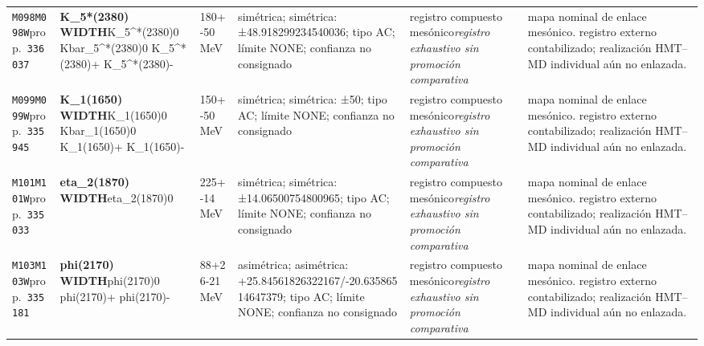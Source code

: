 \begin{landscape}
\begin{longtable}{L{1.85cm}L{4.45cm}L{2.35cm}L{4.05cm}L{3.35cm}L{7.15cm}}
\texttt{M098}\newline \texttt{M098W}\newline prop.\ \texttt{336037} & \textbf{K\_\allowbreak{}5*(2380) WIDTH}\newline K\_\allowbreak{}5\textasciicircum{}*(2380)0 \textbar{}\allowbreak{} Kbar\_\allowbreak{}5\textasciicircum{}*(2380)0 \textbar{}\allowbreak{} K\_\allowbreak{}5\textasciicircum{}*(2380)+ \textbar{}\allowbreak{} K\_\allowbreak{}5\textasciicircum{}*(2380)- & 180+-50\,MeV & simétrica; simétrica: ±48.918299234540036; tipo AC; límite NONE; confianza no consignado & registro compuesto mesónico\newline \emph{registro exhaustivo sin promoción comparativa} & mapa nominal de enlace mesónico. registro externo contabilizado; realización HMT--MD individual aún no enlazada. \\
\texttt{M099}\newline \texttt{M099W}\newline prop.\ \texttt{335945} & \textbf{K\_\allowbreak{}1(1650) WIDTH}\newline K\_\allowbreak{}1(1650)0 \textbar{}\allowbreak{} Kbar\_\allowbreak{}1(1650)0 \textbar{}\allowbreak{} K\_\allowbreak{}1(1650)+ \textbar{}\allowbreak{} K\_\allowbreak{}1(1650)- & 150+-50\,MeV & simétrica; simétrica: ±50; tipo AC; límite NONE; confianza no consignado & registro compuesto mesónico\newline \emph{registro exhaustivo sin promoción comparativa} & mapa nominal de enlace mesónico. registro externo contabilizado; realización HMT--MD individual aún no enlazada. \\
\texttt{M101}\newline \texttt{M101W}\newline prop.\ \texttt{335033} & \textbf{eta\_\allowbreak{}2(1870) WIDTH}\newline eta\_\allowbreak{}2(1870)0 & 225+-14\,MeV & simétrica; simétrica: ±14.06500754800965; tipo AC; límite NONE; confianza no consignado & registro compuesto mesónico\newline \emph{registro exhaustivo sin promoción comparativa} & mapa nominal de enlace mesónico. registro externo contabilizado; realización HMT--MD individual aún no enlazada. \\
\texttt{M103}\newline \texttt{M103W}\newline prop.\ \texttt{335181} & \textbf{phi(2170) WIDTH}\newline phi(2170)0 \textbar{}\allowbreak{} phi(2170)+ \textbar{}\allowbreak{} phi(2170)- & 88+26-21\,MeV & asimétrica; asimétrica: +25.84561826322167/-20.63586514647379; tipo AC; límite NONE; confianza no consignado & registro compuesto mesónico\newline \emph{registro exhaustivo sin promoción comparativa} & mapa nominal de enlace mesónico. registro externo contabilizado; realización HMT--MD individual aún no enlazada. \\

\end{longtable}
\end{landscape}
